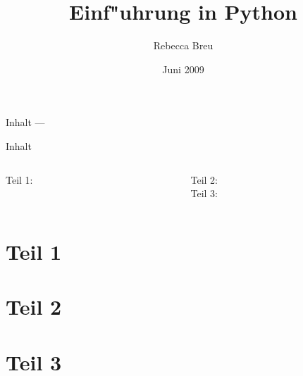 \documentclass{beamer}
\title{Einf"uhrung in Python}
\date{Juni 2009}
\author{Rebecca Breu}
\institute
{
 Verteilte Systeme und Grid-Computing \\
 JSC\\
 Forschungszentrum J"ulich
}
\begin{document}

\AtBeginPart
{
  \begin{frame}
  \titlepage
  \end{frame}

  \begin{frame}{Inhalt --- \insertpart}
  \tableofcontents
  \end{frame}
}


\AtBeginSection[]
{
   \begin{frame}{\insertsection}
       \tableofcontents[currentsection]
   \end{frame}
}


\begin{frame}
\titlepage
\end{frame}

\begin{frame}{Inhalt}
\begin{columns}[t]

\begin{column}{0.4\textwidth}
  Teil 1:\\[3mm]
  \tableofcontents[part=1]
\end{column}

\begin{column}{0.6\textwidth}
  Teil 2:\\[3mm]
  \tableofcontents[part=2]
  \vspace{7mm}
  Teil 3:\\[3mm]
  \tableofcontents[part=3]
\end{column}

\end{columns}
\end{frame}


\part{Teil 1}









\vielspass

\part{Teil 2}



%


\vielspass

\part{Teil 3}




\vielspass
\end{document}
